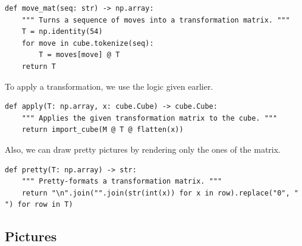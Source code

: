 \documentclass[11pt, oneside]{article}
\theoremstyle{plain}
\begin{document}
\begin{verbatim}
def move_mat(seq: str) -> np.array:
    """ Turns a sequence of moves into a transformation matrix. """
    T = np.identity(54)
    for move in cube.tokenize(seq):
        T = moves[move] @ T
    return T
\end{verbatim}

To apply a transformation, we use the logic given earlier.

\begin{verbatim}
def apply(T: np.array, x: cube.Cube) -> cube.Cube:
    """ Applies the given transformation matrix to the cube. """
    return import_cube(M @ T @ flatten(x))
\end{verbatim}

Also, we can draw pretty pictures by rendering only the ones of the matrix.
\begin{verbatim}
def pretty(T: np.array) -> str:
    """ Pretty-formats a transformation matrix. """
    return "\n".join("".join(str(int(x)) for x in row).replace("0", " ") for row in T)
\end{verbatim}

\newpage

\subsection{Pictures}
\end{document}
